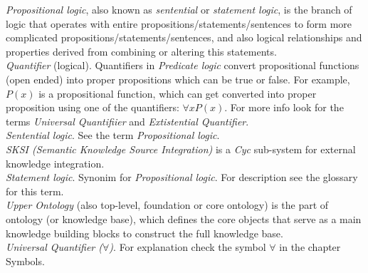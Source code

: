 \emph{Propositional logic}, also known as \emph{sentential} or 
\emph{statement logic}, is the branch of logic that operates with entire
propositions/statements/sentences to form more complicated 
propositions/statements/sentences, and also logical relationships and properties
derived from combining  or altering this statements.\\

\emph{Quantifier} (logical). Quantifiers in \emph{Predicate logic} convert
propositional functions (open ended) into proper propositions which can be true
or false. For example, $P(x)$ is a propositional function, which can get
converted into proper proposition using one of the quantifiers: 
$\forall x P(x)$. For more info look for the terms \emph{Universal Quantifiier}
and \emph{Extistential Quantifier}.\\

\emph{Sentential logic}. See the term \emph{Propositional logic}.\\

\emph{SKSI (Semantic Knowledge Source Integration)} is a \emph{Cyc} sub-system
for external knowledge integration.\\

\emph{Statement logic}. Synonim for \emph{Propositional logic}. For description
see the glossary for this term.\\

\emph{Upper Ontology} (also top-level, foundation or core ontology) is the part
of ontology (or knowledge base), which defines the core objects that serve as a
main knowledge building blocks to construct the full knowledge base.\\

\emph{Universal Quantifier ($\forall$)}. For explanation check the symbol 
$\forall$ in the chapter Symbols. \\

